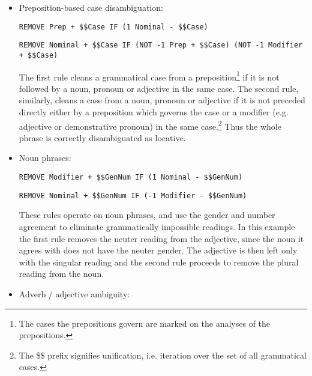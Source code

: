 \documentclass{book}
\begin{document}
\begin{itemize}
\item Preposition-based case disambiguation:


\texttt{REMOVE Prep + \$\$Case IF (1 Nominal - \$\$Case)}

\texttt{REMOVE Nominal + \$\$Case IF (NOT -1 Prep + \$\$Case) (NOT -1 Modifier + \$\$Case)}

The first rule cleans a grammatical case from a preposition\footnote{The cases the prepositions govern
are marked on the analyses of the prepositions.} 
if it is not followed by a noun, pronoun or adjective in the same case. The second
rule, similarly, cleans a case from a noun, pronoun or adjective if
it is not preceded directly either by a preposition which governs the case
or a modifier (e.g. adjective or demonstrative pronoun) in the same case.\footnote{The \$\$ prefix signifies unification, i.e. iteration over the set of all
grammatical cases.}
Thus the whole phrase is correctly disambiguated as locative.

\item Noun phrases:


\texttt{REMOVE Modifier + \$\$GenNum IF (1 Nominal - \$\$GenNum)}

\texttt{REMOVE Nominal + \$\$GenNum IF (-1 Modifier - \$\$GenNum)}

These rules operate on noun phrases, and use the gender and number agreement
to eliminate grammatically impossible readings. 
In this example the first rule removes the neuter reading from the 
adjective, since the noun it agrees with does not have the neuter gender.
The adjective is then left only with the singular reading and the second rule 
proceeds to remove the plural reading from the noun.


\item Adverb / adjective ambiguity:

\end{itemize}
\end{document}
